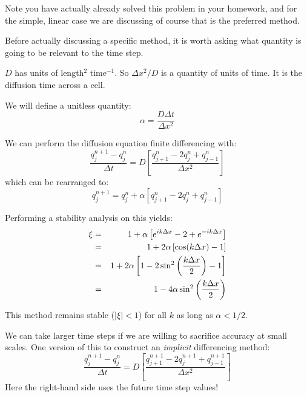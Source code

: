 Note you have actually already solved this problem in your homework,
and for the simple, linear case we are discussing of course that is
the preferred method.

Before actually discussing a specific method, it is worth asking what
quantity is going to be relevant to the time step.


\begin{answer}
$D$ has units of length$^2$ time$^{-1}$. So $\Delta x^2 / D$ is a
quantity of units of time. It is the diffusion time across a cell. 
\end{answer}

We will define a unitless quantity:
\begin{equation}
\alpha = \frac{D \Delta t}{\Delta x^2}
\end{equation}

We can perform the diffusion equation finite differencing with:
\begin{equation}
\frac{q_j^{n+1} - q_j^{n}}{\Delta t} = D \left[\frac{q_{j+1}^n - 2
q_j^n + q_{j-1}^n}{\Delta x^2}\right]
\end{equation}
which can be rearranged to:
\begin{equation}
q_j^{n+1} = q_j^{n} + \alpha \left[q_{j+1}^n - 2
q_j^n + q_{j-1}^n\right]
\end{equation}

Performing a stability analysis on this yields:
\begin{eqnarray}
\xi &=& 1 + \alpha \left[e^{ik\Delta x} - 2 + e^{-ik \Delta
x}\right] \cr
&=& 1 + 2 \alpha \left[\cos(k\Delta x) - 1 \right] \cr
&=& 1 + 2 \alpha \left[1 - 2\sin^2\left(\frac{k\Delta x}{2}\right) - 1 \right] \cr
&=& 1 - 4 \alpha \sin^2\left(\frac{k\Delta x}{2}\right) 
\end{eqnarray}


\begin{answer}
This method remains stable ($|\xi|<1$) for all $k$ as long as $\alpha
< 1/2$.
\end{answer}

We can take larger time steps if we are willing to sacrifice accuracy
at small scales. One version of this to construct an {\it implicit}
differencing method:
\begin{equation}
\frac{q_j^{n+1} - q_j^{n}}{\Delta t} = D \left[\frac{q_{j+1}^{n+1} - 2
q_j^{n+1} + q_{j-1}^{n+1}}{\Delta x^2}\right]
\end{equation}
Here the right-hand side uses the future time step values!

